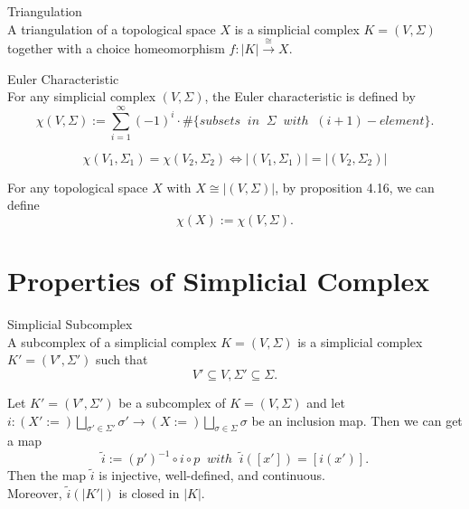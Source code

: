 \begin{definition}{Triangulation}\\
A triangulation of a topological space $X$ is a simplicial complex $K = (V,\Sigma)$ together with a choice homeomorphism $f: |K| \xrightarrow{\cong} X$.
\end{definition}

\begin{definition}{Euler Characteristic}\\
For any simplicial complex $(V,\Sigma)$, the Euler characteristic is defined by
$$\chi (V,\Sigma) := \sum_{i=1}^\infty (-1)^i \cdot \#\{ subsets\;\;in\;\;\Sigma\;\;with\;\;(i+1)-element \}.$$
\end{definition}

\begin{proposition}
    $$\chi(V_1,\Sigma_1) = \chi(V_2,\Sigma_2) \Leftrightarrow |(V_1,\Sigma_1)| = |(V_2,\Sigma_2)|$$
\end{proposition}

\begin{definition}
    For any topological space $X$ with $X \cong |(V,\Sigma)|$, by proposition 4.16, we can define
    $$\chi (X) := \chi (V,\Sigma).$$
\end{definition}

\section{Properties of Simplicial Complex}

\begin{definition}{Simplicial Subcomplex}\\
A subcomplex of a simplicial complex $K = (V,\Sigma)$ is a simplicial complex $K' = (V',\Sigma')$ such that
$$V' \subseteq V, \Sigma' \subseteq \Sigma.$$
\end{definition}

\begin{proposition}
    Let $K' = (V',\Sigma')$ be a subcomplex of $K=(V,\Sigma)$ and let $i: (X':=) \bigsqcup _{\sigma' \in \Sigma'} \sigma' \rightarrow (X:=) \bigsqcup_{\sigma\in \Sigma}\sigma$ be an inclusion map. Then we can get a map
    $$\widetilde{i} := (p')^{-1} \circ i \circ p \;\; with\;\; \widetilde{i}([x']) = [i(x')].$$
    Then the map $\widetilde{i}$ is injective, well-defined, and continuous.\\
    Moreover, $\widetilde{i} (|K'|) $ is closed in $|K|$.
\end{proposition}

